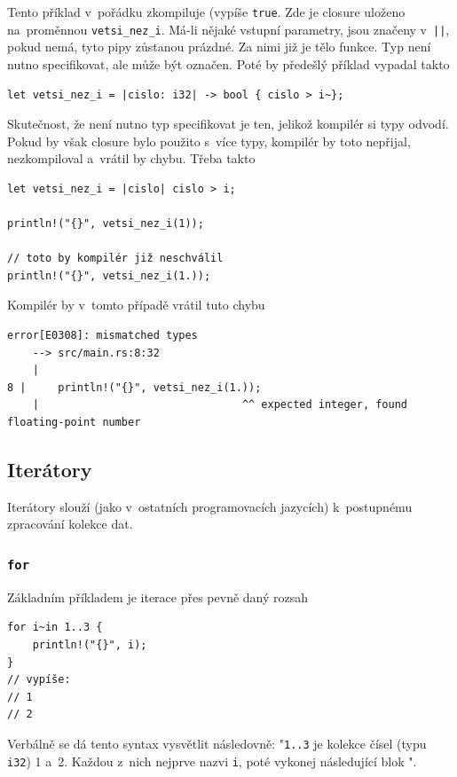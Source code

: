 \documentclass[a4paper, 12pt]{article} %
\newcommand{\rust}[1]{\texttt{#1}}
\begin{document}
            Tento příklad v~pořádku zkompiluje (vypíše \texttt{true}. Zde je closure uloženo na~proměnnou \rust{vetsi_nez_i}. Má-li nějaké vstupní parametry, jsou značeny v~\rust{||}, pokud nemá, tyto pipy zůstanou prázdné. Za nimi již je tělo funkce. Typ není nutno specifikovat, ale může být označen. Poté by předešlý příklad vypadal takto
            \begin{verbatim}
let vetsi_nez_i = |cislo: i32| -> bool { cislo > i~};
            \end{verbatim}
            
            Skutečnost, že není nutno typ specifikovat je ten, jelikož kompilér si typy odvodí. Pokud by však closure bylo použito s~více typy, kompilér by toto nepřijal, nezkompiloval a~vrátil by chybu. Třeba takto
            \begin{verbatim}
let vetsi_nez_i = |cislo| cislo > i;

println!("{}", vetsi_nez_i(1));

// toto by kompilér již neschválil
println!("{}", vetsi_nez_i(1.));
            \end{verbatim}
            
            Kompilér by v~tomto případě vrátil tuto chybu
            \begin{verbatim}
error[E0308]: mismatched types
    --> src/main.rs:8:32
    |
8 |     println!("{}", vetsi_nez_i(1.));
    |                                ^^ expected integer, found floating-point number
            \end{verbatim}


    \subsection{Iterátory}
        Iterátory slouží (jako v~ostatních programovacích jazycích) k~postupnému zpracování kolekce dat. 


        \subsubsection*{\rust{for}}
            Základním příkladem je iterace přes pevně daný rozsah
            \begin{verbatim}
for i~in 1..3 {
    println!("{}", i);
}
// vypíše:
// 1
// 2
            \end{verbatim}

            Verbálně se dá tento syntax vysvětlit následovně: "\texttt{1..3} je kolekce čísel (typu \texttt{i32}) 1 a~2. Každou z~nich nejprve nazvi \texttt{i}, poté vykonej následující blok \texttt{\string{\dots\string}}".
            
\end{document}
